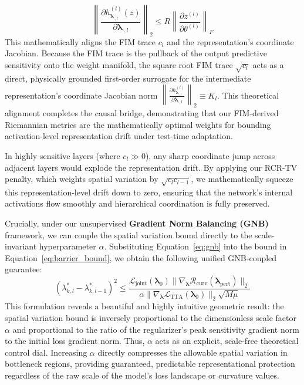 \begin{equation}
\left\| \frac{\partial h^{(l)}_{\boldsymbol{\lambda}_{\cdot, l}}(z)}{\partial \boldsymbol{\lambda}_{\cdot, l}} \right\|_2 \le R \left\| \frac{\partial z^{(l)}}{\partial \theta^{(l)}} \right\|_F
\end{equation}
This mathematically aligns the FIM trace $c_l$ and the representation's coordinate Jacobian. Because the FIM trace is the pullback of the output predictive sensitivity onto the weight manifold, the square root FIM trace $\sqrt{c_l}$ acts as a direct, physically grounded first-order surrogate for the intermediate representation's coordinate Jacobian norm $\left\| \frac{\partial h^{(l)}_{\boldsymbol{\lambda}_{\cdot, l}}}{\partial \boldsymbol{\lambda}_{\cdot, l}} \right\|_2 \equiv K_l$. This theoretical alignment completes the causal bridge, demonstrating that our FIM-derived Riemannian metrics are the mathematically optimal weights for bounding activation-level representation drift under test-time adaptation. 

In highly sensitive layers (where $c_l \gg 0$), any sharp coordinate jump across adjacent layers would explode the representation drift. By applying our RCR-TV penalty, which weights spatial variation by $\sqrt{c_l c_{l-1}}$, we mathematically squeeze this representation-level drift down to zero, ensuring that the network's internal activations flow smoothly and hierarchical coordination is fully preserved.

Crucially, under our unsupervised \textbf{Gradient Norm Balancing (GNB)} framework, we can couple the spatial variation bound directly to the scale-invariant hyperparameter $\alpha$. Substituting Equation~\ref{eq:gnb} into the bound in Equation~\ref{eq:barrier_bound}, we obtain the following unified GNB-coupled guarantee:
\begin{equation}
\label{eq:gnb_barrier_bound}
(\lambda^*_{k, l} - \lambda^*_{k, l-1})^2 \le \frac{\mathcal{L}_{\text{joint}}(\boldsymbol{\lambda}_0) \|\nabla_{\boldsymbol{\lambda}} \mathcal{R}_{\text{curv}}(\boldsymbol{\lambda}_{\text{pert}})\|_2}{\alpha \|\nabla_{\boldsymbol{\lambda}} \mathcal{L}_{\text{TTA}}(\boldsymbol{\lambda}_0)\|_2 \sqrt{M \mu}}
\end{equation}
This formulation reveals a beautiful and highly intuitive geometric result: the spatial variation bound is inversely proportional to the dimensionless scale factor $\alpha$ and proportional to the ratio of the regularizer's peak sensitivity gradient norm to the initial loss gradient norm. Thus, $\alpha$ acts as an explicit, scale-free theoretical control dial. Increasing $\alpha$ directly compresses the allowable spatial variation in bottleneck regions, providing guaranteed, predictable representational protection regardless of the raw scale of the model's loss landscape or curvature values.

